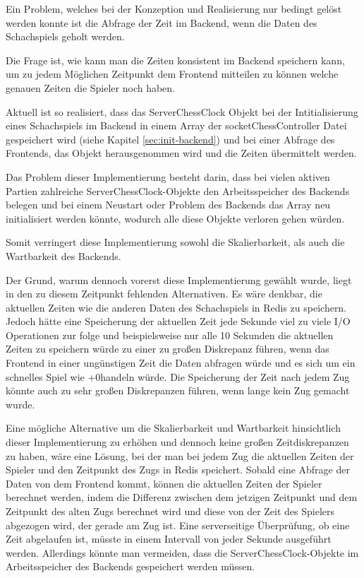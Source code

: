 Ein Problem, welches bei der Konzeption und Realisierung nur bedingt gelöst werden konnte ist die Abfrage der Zeit im Backend, wenn die Daten des Schachspiels geholt werden.

Die Frage ist, wie kann man die Zeiten konsistent im Backend speichern kann, um zu jedem Möglichen Zeitpunkt dem Frontend mitteilen zu können welche genauen Zeiten die Spieler noch haben.

Aktuell ist so realisiert, dass das ServerChessClock Objekt bei der Intitialisierung eines Schachspiels im Backend in einem Array der socketChessController Datei gespeichert wird (siehe Kapitel \ref{sec:init-backend}) und bei einer Abfrage des Frontends, das Objekt herausgenommen wird und die Zeiten übermittelt werden.

Das Problem dieser Implementierung besteht darin, dass bei vielen aktiven Partien zahlreiche ServerChessClock-Objekte den Arbeitsspeicher des Backends belegen und bei einem Neustart oder Problem des Backends das Array neu initialisiert werden könnte, wodurch alle diese Objekte verloren gehen würden. 

Somit verringert diese Implementierung sowohl die Skalierbarkeit, als auch die Wartbarkeit des Backends.

Der Grund, warum dennoch vorerst diese Implementierung gewählt wurde, liegt in den zu diesem Zeitpunkt fehlenden Alternativen. Es wäre denkbar, die aktuellen Zeiten wie die anderen Daten des Schachspiels in Redis zu speichern. Jedoch hätte eine Speicherung der aktuellen Zeit jede Sekunde viel zu viele I/O Operationen zur folge und beispielsweise nur alle 10 Sekunden die aktuellen Zeiten zu speichern würde zu einer zu großen Diskrepanz führen, wenn das Frontend in einer ungünstigen Zeit die Daten abfragen würde und es sich um ein schnelles Spiel wie +0\grqq{ }handeln würde. Die Speicherung der Zeit nach jedem Zug könnte auch zu sehr großen Diskrepanzen führen, wenn lange kein Zug gemacht wurde.

Eine mögliche Alternative um die Skalierbarkeit und Wartbarkeit hinsichtlich dieser Implementierung zu erhöhen und dennoch keine großen Zeitdiskrepanzen zu haben, wäre eine Lösung, bei der man bei jedem Zug die aktuellen Zeiten der Spieler und den Zeitpunkt des Zugs in Redis speichert. Sobald eine Abfrage der Daten von dem Frontend kommt, können die aktuellen Zeiten der Spieler berechnet werden, indem die Differenz zwischen dem jetzigen Zeitpunkt und dem Zeitpunkt des alten Zugs berechnet wird und diese von der Zeit des Spielers abgezogen wird, der gerade am Zug ist. Eine serverseitige Überprüfung, ob eine Zeit abgelaufen ist, müsste in einem Intervall von jeder Sekunde ausgeführt werden. Allerdings könnte man vermeiden, dass die ServerChessClock-Objekte im Arbeitsspeicher des Backends gespeichert werden müssen.

